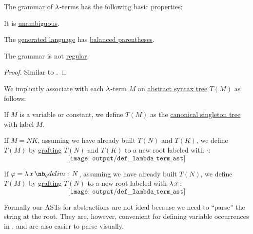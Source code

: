 \begin{proposition}\label{thm:lambda_term_grammar}
  The \hyperref[def:formal_grammar]{grammar} of \hyperref[def:lambda_term]{\( \mathrm{\lambda} \)-terms} has the following basic properties:
  \begin{thmenum}
     It is \hyperref[def:grammar_ambiguity]{unambiguous}.

     The \hyperref[def:formal_grammar/language]{generated language} has \hyperref[def:paired_delimiters]{balanced parentheses}.

     The grammar is not \hyperref[def:chomsky_hierarchy/regular]{regular}.
  \end{thmenum}
\end{proposition}
\begin{proof}
  Similar to .
\end{proof}

\begin{definition}\label{def:lambda_term_ast}
  We implicitly associate with each \( \mathrm{\lambda} \)-term \( M \) an \hyperref[con:abstract_syntax_tree]{abstract syntax tree} \( T(M) \) as follows:
  \begin{thmenum}
     If \( M \) is a variable or constant, we define \( T(M) \) as the \hyperref[def:canonical_singleton_tree]{canonical singleton tree} with label \( M \).

     If \( M = NK \), assuming we have already built \( T(N) \) and \( T(K) \), we define \( T(M) \) by \hyperref[def:ordered_tree_grafting_product]{grafting} \( T(N) \) and \( T(K) \) to a new root labeled with \( \cdot \):
    \begin{equation*}
      \texttt{[image: output/def\_\_lambda\_term\_ast]}
    \end{equation*}

     If \( \varphi = \qabs x N \), assuming we have already built \( T(N) \), we define \( T(M) \) by \hyperref[def:ordered_tree_grafting_product]{grafting} \( T(N) \) to a new root labeled with \( \qabs* x \):
    \begin{equation*}
      \texttt{[image: output/def\_\_lambda\_term\_ast]}
    \end{equation*}
  \end{thmenum}
\end{definition}
\begin{comments}
  \item Formally our ASTs for abstractions are not ideal because we need to \enquote{parse} the string at the root. They are, however, convenient for defining variable occurrences in , and are also easier to parse visually.
\end{comments}

